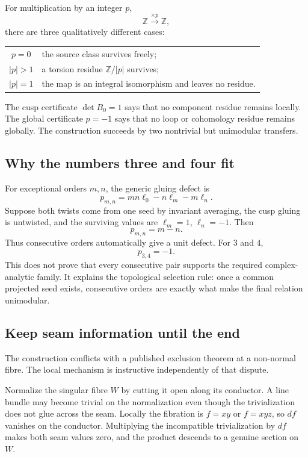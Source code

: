 \documentclass[11pt,reqno]{amsart}
\numberwithin{equation}{section}
\newcommand{\Z}{\mathbb Z}
\theoremstyle{definition}
\begin{document}
For multiplication by an integer $p$,
\[
\Z\xrightarrow{\times p}\Z,
\]
there are three qualitatively different cases:
\begin{center}
\begin{tabular}{@{}cl@{}}
\toprule
$p=0$ & the source class survives freely;\\
$|p|>1$ & a torsion residue $\Z/|p|$ survives;\\
$|p|=1$ & the map is an integral isomorphism and leaves no residue.\\
\bottomrule
\end{tabular}
\end{center}
The cusp certificate $\det B_0=1$ says that no component residue remains locally. The global certificate $p=-1$ says that no loop or cohomology residue remains globally. The construction succeeds by two nontrivial but unimodular transfers.

\subsection{Why the numbers three and four fit}

For exceptional orders $m,n$, the generic gluing defect is
\[
p_{m,n}=mn\ell_0-n\ell_m-m\ell_n.
\]
Suppose both twists come from one seed by invariant averaging, the cusp gluing is untwisted, and the surviving values are $\ell_m=1$, $\ell_n=-1$. Then
\[
p_{m,n}=m-n.
\]
Thus consecutive orders automatically give a unit defect. For $3$ and $4$,
\[
p_{3,4}=-1.
\]
This does not prove that every consecutive pair supports the required complex-analytic family. It explains the topological selection rule: once a common projected seed exists, consecutive orders are exactly what make the final relation unimodular.

\subsection{Keep seam information until the end}

The construction conflicts with a published exclusion theorem at a non-normal fibre. The local mechanism is instructive independently of that dispute.

Normalize the singular fibre $W$ by cutting it open along its conductor. A line bundle may become trivial on the normalization even though the trivialization does not glue across the seam. Locally the fibration is $f=xy$ or $f=xyz$, so $df$ vanishes on the conductor. Multiplying the incompatible trivialization by $df$ makes both seam values zero, and the product descends to a genuine section on $W$.
\end{document}

